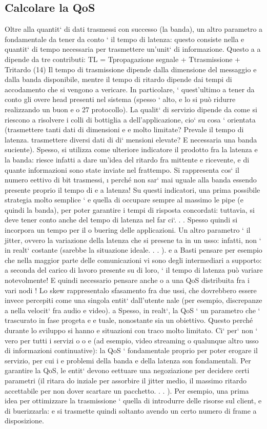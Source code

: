 \documentclass[a4paper,12pt]{article}
\begin{document}
\subsection{Calcolare la QoS}
Oltre alla quantit` di dati trasmessi con successo (la banda), un altro parametro
a
fondamentale da tener da conto ` il tempo di latenza: questo consiste nella
e
quantit` di tempo necessaria per trasmettere un'unit` di informazione. Questo
a
a
dipende da tre contributi:
TL = Tpropagazione segnale + Ttrasmissione + Tritardo
(14)
Il tempo di trasmissione dipende dalla dimensione del messaggio e dalla banda
disponibile, mentre il tempo di ritardo dipende dai tempi di accodamento che
si vengono a vericare. In particolare, ` quest'ultimo a tener da conto gli overe
head presenti nel sistema (spesso ` alto, e lo si può ridurre realizzando un buon
e
o
27
protocollo).
La qualit` di servizio dipende da come si riescono a risolvere i colli di bottiglia
a
dell'applicazione, cio` su cosa ` orientata (trasmettere tanti dati di dimensioni
e
e
molto limitate? Prevale il tempo di latenza. trasmettere diversi dati di di`
mensioni elevate? E necessaria una banda suciente). Spesso, si utilizza come
ulteriore indicatore il prodotto fra la latenza e la banda: riesce infatti a dare
un'idea del ritardo fra mittente e ricevente, e di quante informazioni sono state
inviate nel frattempo. Si rappresenta cos` il numero eettivo di bit trasmessi,
\i{}
perché non sar` mai uguale alla banda essendo presente proprio il tempo di
e
a
latenza! Su questi indicatori, una prima possibile strategia molto semplice `
e
quella di occupare sempre al massimo le pipe (e quindi la banda), per poter
garantire i tempi di risposta concordati: tuttavia, si deve tener conto anche
del tempo di latenza nel far ci`. . . Spesso quindi si incorpora un tempo per il
o
buering delle applicazioni.
Un altro parametro ` il jitter, ovvero la variazione della latenza che si presene
ta in un usso: infatti, non ` in realt` costante (sarebbe la situazione ideale. . . ).
e
a
Basti pensare per esempio che nella maggior parte delle comunicazioni vi sono
degli intermediari a supporto: a seconda del carico di lavoro presente su di loro,
`
il tempo di latenza può variare notevolmente! E quindi necessario pensare anche
o
a una QoS distribuita fra i vari nodi !
Lo skew rappresentalo sfasamento fra due ussi, che dovrebbero essere invece
percepiti come una singola entit` dall'utente nale (per esempio, discrepanze
a
nella velocit` fra audio e video).
a
Spesso, in realt`, la QoS ` un parametro che ` trascurato in fase progeta
e
e
tuale, nonostante sia un obiettivo. Questo perché durante lo sviluppo si hanno
e
situazioni con traco molto limitato. Ci` per` non ` vero per tutti i servizi
o
o
e
(ad esempio, video streaming o qualunque altro usso di informazioni continuative): la QoS ` fondamentale proprio per
poter erogare il servizio, per cui i
e
problemi della banda e della latenza son fondamentali. Per garantire la QoS, le
entit` devono eettuare una negoziazione per decidere certi parametri (il ritara
do inziale per assorbire il jitter medio, il massimo ritardo accettabile per non
dover scartare un pacchetto. . . ). Per esempio, una prima idea per ottimizzare
la trasmissione ` quella di introdurre delle risorse sul client, e di buerizzarla:
e
si trasmette quindi soltanto avendo un certo numero di frame a disposizione.
\end{document}
